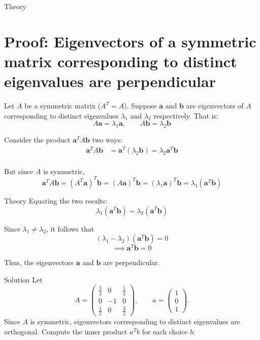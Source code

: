 \documentclass{beamer}
\begin{document}
\begin{frame}{Theory}
    \section*{Proof: Eigenvectors of a symmetric matrix corresponding to distinct eigenvalues are perpendicular}

Let $A$ be a symmetric matrix ($A^T = A$). Suppose $\mathbf{a}$ and $\mathbf{b}$ are eigenvectors of $A$ corresponding to distinct eigenvalues $\lambda_1$ and $\lambda_2$ respectively. That is:
\[
A\mathbf{a} = \lambda_1 \mathbf{a}, \qquad A\mathbf{b} = \lambda_2 \mathbf{b}
\]

Consider the product $\mathbf{a}^T A \mathbf{b}$ two ways:
\begin{align*}
\mathbf{a}^T A \mathbf{b} &= \mathbf{a}^T (\lambda_2 \mathbf{b}) = \lambda_2 \mathbf{a}^T \mathbf{b} \\
\end{align*}

But since $A$ is symmetric, 
\[
\mathbf{a}^T A \mathbf{b} = (A^T \mathbf{a})^T \mathbf{b} = (A \mathbf{a})^T \mathbf{b} = (\lambda_1 \mathbf{a})^T \mathbf{b} = \lambda_1 (\mathbf{a}^T \mathbf{b})
\]
\end{frame}
\begin{frame}{Theory}
Equating the two results:
\[
\lambda_1 (\mathbf{a}^T \mathbf{b}) = \lambda_2 (\mathbf{a}^T \mathbf{b})
\]

Since $\lambda_1 \neq \lambda_2$, it follows that
\[
(\lambda_1 - \lambda_2)(\mathbf{a}^T \mathbf{b}) = 0
\]
\[
\implies \mathbf{a}^T \mathbf{b} = 0
\]

Thus, the eigenvectors $\mathbf{a}$ and $\mathbf{b}$ are perpendicular.

\end{frame}
\begin{frame}{Solution}
   Let
\[
A=\begin{pmatrix}
\frac{3}{2} & 0 & \frac{1}{2} \\[4pt]
0 & -1 & 0 \\[4pt]
\frac{1}{2} & 0 & \frac{3}{2}
\end{pmatrix},
\qquad
a=\begin{pmatrix}1\\[2pt]0\\[2pt]1\end{pmatrix}.
\]
Since \(A\) is symmetric, eigenvectors corresponding to distinct eigenvalues are orthogonal.
Compute the inner product \(a^T b\) for each choice \(b\):
\end{frame}
\end{document}
